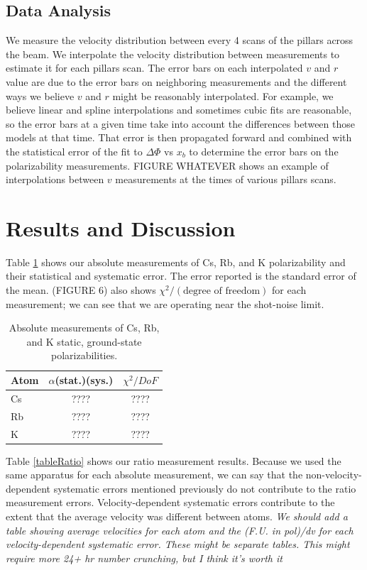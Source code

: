 \documentclass[twocolumn, prl,showpacs,superscriptaddress]{revtex4-1}   %
\begin{document}
\subsection{Data Analysis}

We measure the velocity distribution between every 4 scans of the pillars across the beam. We interpolate the velocity distribution between measurements to estimate it for each pillars scan. The error bars on each interpolated $v$ and $r$ value are due to the error bars on neighboring measurements and the different ways we believe $v$ and $r$ might be reasonably interpolated. For example, we believe linear and spline interpolations and sometimes cubic fits are reasonable, so the error bars at a given time take into account the differences between those models at that time. That error is then propagated forward and combined with the statistical error of the fit to $\Delta\Phi$ vs $x_b$ to determine the error bars on the polarizability measurements. FIGURE WHATEVER shows an example of interpolations between $v$ measurements at the times of various pillars scans.

\section{Results and Discussion}

Table \ref{tableAbs} shows our absolute measurements of Cs, Rb, and K polarizability and their statistical and systematic error. The error reported is the standard error of the mean. (FIGURE 6) also shows $\chi^2/(\text{degree of freedom})$ for each measurement; we can see that we are operating near the shot-noise limit. 

\begingroup
\begin{table}
\caption{\label{tableAbs}Absolute measurements of Cs, Rb, and K static, ground-state polarizabilities.}
\begin{center}
\begin{tabular}{l c c}
\hline\hline
Atom & $\alpha$(stat.)(sys.) & $\chi^2/DoF$ \\
\hline
Cs & ???? & ???? \\
Rb & ???? & ???? \\
K  & ???? & ???? \\
\hline\hline
\end{tabular}
\end{center}
\end{table}
\endgroup

Table \ref{tableRatio} shows our ratio measurement results. Because we used the same apparatus for each absolute measurement, we can say that the non-velocity-dependent systematic errors mentioned previously do not contribute to the ratio measurement errors. Velocity-dependent systematic errors contribute to the extent that the average velocity was different between atoms. \textit{We should add a table showing average velocities for each atom and the (F.U. in pol)/dv for each velocity-dependent systematic error. These might be separate tables. This might require more 24+ hr number crunching, but I think it's worth it} 
\end{document}

